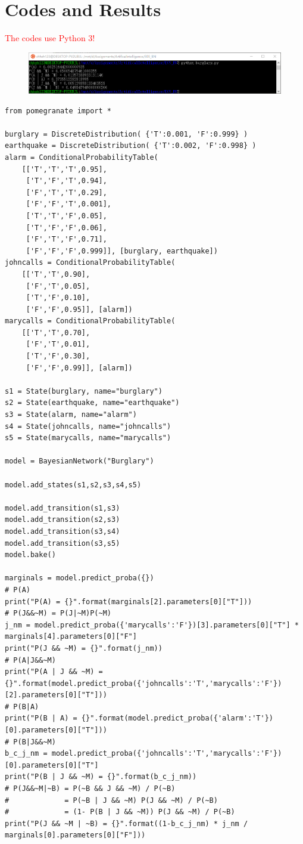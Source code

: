 \documentclass[a4paper, 11pt]{article}
\begin{document}
\section{Codes and Results}
\textcolor{red}{The codes use Python 3!}
\begin{figure}[H]
\centering
\includegraphics[width=\linewidth]{fig/result1.png}
\end{figure}
\begin{lstlisting}[title=burglary.py]
from pomegranate import *

burglary = DiscreteDistribution( {'T':0.001, 'F':0.999} )
earthquake = DiscreteDistribution( {'T':0.002, 'F':0.998} )
alarm = ConditionalProbabilityTable(
	[['T','T','T',0.95],
	 ['T','F','T',0.94],
	 ['F','T','T',0.29],
	 ['F','F','T',0.001],
	 ['T','T','F',0.05],
	 ['T','F','F',0.06],
	 ['F','T','F',0.71],
	 ['F','F','F',0.999]], [burglary, earthquake])
johncalls = ConditionalProbabilityTable(
	[['T','T',0.90],
	 ['F','T',0.05],
	 ['T','F',0.10],
	 ['F','F',0.95]], [alarm])
marycalls = ConditionalProbabilityTable(
	[['T','T',0.70],
	 ['F','T',0.01],
	 ['T','F',0.30],
	 ['F','F',0.99]], [alarm])

s1 = State(burglary, name="burglary")
s2 = State(earthquake, name="earthquake")
s3 = State(alarm, name="alarm")
s4 = State(johncalls, name="johncalls")
s5 = State(marycalls, name="marycalls")

model = BayesianNetwork("Burglary")

model.add_states(s1,s2,s3,s4,s5)

model.add_transition(s1,s3)
model.add_transition(s2,s3)
model.add_transition(s3,s4)
model.add_transition(s3,s5)
model.bake()

marginals = model.predict_proba({})
# P(A)
print("P(A) = {}".format(marginals[2].parameters[0]["T"]))
# P(J&&~M) = P(J|~M)P(~M)
j_nm = model.predict_proba({'marycalls':'F'})[3].parameters[0]["T"] * marginals[4].parameters[0]["F"]
print("P(J && ~M) = {}".format(j_nm))
# P(A|J&&~M)
print("P(A | J && ~M) = {}".format(model.predict_proba({'johncalls':'T','marycalls':'F'})[2].parameters[0]["T"]))
# P(B|A)
print("P(B | A) = {}".format(model.predict_proba({'alarm':'T'})[0].parameters[0]["T"]))
# P(B|J&&~M)
b_c_j_nm = model.predict_proba({'johncalls':'T','marycalls':'F'})[0].parameters[0]["T"]
print("P(B | J && ~M) = {}".format(b_c_j_nm))
# P(J&&~M|~B) = P(~B && J && ~M) / P(~B)
#             = P(~B | J && ~M) P(J && ~M) / P(~B)
#             = (1- P(B | J && ~M)) P(J && ~M) / P(~B)
print("P(J && ~M | ~B) = {}".format((1-b_c_j_nm) * j_nm / marginals[0].parameters[0]["F"]))
\end{lstlisting}
\end{document}
